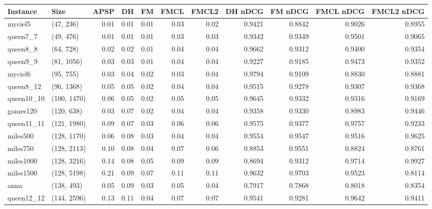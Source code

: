 \begin{tabular}{llrrrrrrrrr}
\toprule
  Instance &         Size &  APSP &   DH &   FM &  FMCL &  FMCL2 &  DH nDCG &  FM nDCG &  FMCL nDCG &  FMCL2 nDCG \\
\midrule
   myciel5 &    (47, 236) &  0.01 & 0.01 & 0.01 &  0.03 &   0.02 &   0.9421 &   0.8842 &     0.9026 &      0.8955 \\
  queen7\_7 &    (49, 476) &  0.01 & 0.01 & 0.01 &  0.03 &   0.03 &   0.9342 &   0.9349 &     0.9501 &      0.9065 \\
  queen8\_8 &    (64, 728) &  0.02 & 0.02 & 0.01 &  0.04 &   0.04 &   0.9662 &   0.9312 &     0.9400 &      0.9354 \\
  queen9\_9 &   (81, 1056) &  0.03 & 0.03 & 0.01 &  0.04 &   0.04 &   0.9227 &   0.9185 &     0.9473 &      0.9352 \\
   myciel6 &    (95, 755) &  0.03 & 0.04 & 0.02 &  0.03 &   0.04 &   0.9794 &   0.9109 &     0.8830 &      0.8881 \\
 queen8\_12 &   (96, 1368) &  0.05 & 0.05 & 0.02 &  0.04 &   0.04 &   0.9515 &   0.9278 &     0.9307 &      0.9368 \\
queen10\_10 &  (100, 1470) &  0.06 & 0.05 & 0.02 &  0.05 &   0.05 &   0.9645 &   0.9332 &     0.9316 &      0.9169 \\
  games120 &   (120, 638) &  0.03 & 0.07 & 0.02 &  0.04 &   0.04 &   0.9358 &   0.9330 &     0.8983 &      0.9446 \\
queen11\_11 &  (121, 1980) &  0.09 & 0.07 & 0.03 &  0.06 &   0.06 &   0.9575 &   0.9377 &     0.9757 &      0.9233 \\
  miles500 &  (128, 1170) &  0.06 & 0.08 & 0.03 &  0.04 &   0.04 &   0.9554 &   0.9547 &     0.9516 &      0.9625 \\
  miles750 &  (128, 2113) &  0.10 & 0.08 & 0.04 &  0.07 &   0.06 &   0.8853 &   0.9551 &     0.8824 &      0.8761 \\
 miles1000 &  (128, 3216) &  0.14 & 0.08 & 0.05 &  0.09 &   0.09 &   0.8694 &   0.9312 &     0.9714 &      0.9927 \\
 miles1500 &  (128, 5198) &  0.21 & 0.09 & 0.07 &  0.11 &   0.11 &   0.9632 &   0.9703 &     0.9523 &      0.8114 \\
      anna &   (138, 493) &  0.05 & 0.09 & 0.03 &  0.05 &   0.04 &   0.7917 &   0.7868 &     0.8018 &      0.8354 \\
queen12\_12 &  (144, 2596) &  0.13 & 0.11 & 0.04 &  0.07 &   0.07 &   0.9541 &   0.9281 &     0.9642 &      0.9411 \\

\end{tabular}
